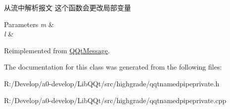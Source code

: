 从流中解析报文 这个函数会更改局部变量 


\begin{DoxyParams}{Parameters}
{\em m} & \\
\hline
{\em l} & \\
\hline
\end{DoxyParams}


Reimplemented from \mbox{\hyperlink{class_q_qt_message_a0bc25669bdd61490b1d8df6d77565f31}{Q\+Qt\+Message}}.



The documentation for this class was generated from the following files\+:\begin{DoxyCompactItemize}
\item 
R\+:/\+Develop/a0-\/develop/\+Lib\+Q\+Qt/src/highgrade/qqtnamedpipeprivate.\+h\item 
R\+:/\+Develop/a0-\/develop/\+Lib\+Q\+Qt/src/highgrade/qqtnamedpipeprivate.\+cpp\end{DoxyCompactItemize}
